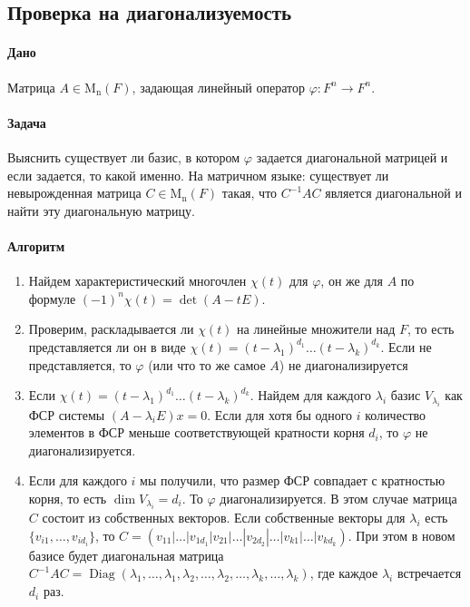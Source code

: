 \documentclass{article}
\newcommand{\Matrix}[2]{\operatorname{\mathrm{M}_{#2}}(#1)}
\begin{document}
\subsection{Проверка на диагонализуемость}

\paragraph{Дано}

Матрица $A\in\Matrix{F}{n}$, задающая линейный оператор $\varphi\colon F^n\to F^n$.

\paragraph{Задача}

Выяснить существует ли базис, в котором $\varphi$ задается диагональной матрицей и если задается, то какой именно.
На матричном языке: существует ли невырожденная матрица $C\in \Matrix{F}{n}$ такая, что $C^{-1}AC$ является диагональной и найти эту диагональную матрицу.

\paragraph{Алгоритм}

\begin{enumerate}
\item Найдем характеристический многочлен $\chi(t)$ для $\varphi$, он же для $A$ по формуле $(-1)^n\chi(t) = \det(A-t E)$.

\item Проверим, раскладывается ли $\chi(t)$ на линейные множители над $F$, то есть представляется ли он в виде $\chi(t) = (t-\lambda_1)^{d_1} \ldots (t-\lambda_k)^{d_k}$.
Если не представляется, то $\varphi$ (или что то же самое $A$) не диагонализируется

\item Если $\chi(t) = (t-\lambda_1)^{d_1} \ldots (t-\lambda_k)^{d_k}$.
Найдем для каждого $\lambda_i$ базис $V_{\lambda_i}$ как ФСР системы $(A-\lambda_i E)x = 0$.
Если для хотя бы одного $i$ количество элементов в ФСР меньше соответствующей кратности корня $d_i$, то $\varphi$ не диагонализируется.

\item Если для каждого $i$ мы получили, что размер ФСР совпадает с кратностью корня, то есть $\dim V_{\lambda_i} = d_i$.
То $\varphi$ диагонализируется.
В этом случае матрица $C$ состоит из собственных векторов.
Если собственные векторы для $\lambda_i$ есть $\{v_{i1},\ldots,v_{id_i}\}$, то $C = (v_{11}|\ldots|v_{1d_1}|v_{21}|\ldots|v_{2d_2}|\ldots |v_{k1}|\ldots|v_{kd_k})$.
При этом в новом базисе будет диагональная матрица $C^{-1}AC =\operatorname{Diag}(\lambda_1,\ldots,\lambda_1,\lambda_2,\ldots,\lambda_2,\ldots,\lambda_k,\ldots,\lambda_k)$, где каждое $\lambda_i$ встречается $d_i$ раз.
\end{enumerate}
\end{document}
